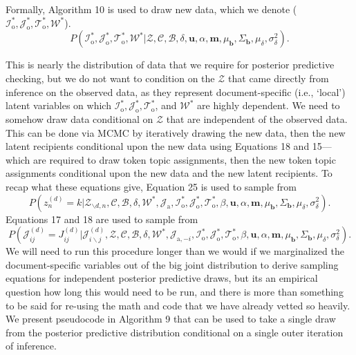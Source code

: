 \documentclass[a4paper]{article}
\begin{document}
Formally, Algorithm 10 is used to draw new data, which we denote ($\mathcal{I}_{\mbox{o}}^*, \mathcal{J}_{\mbox{o}}^*, \mathcal{T}_{\mbox{o}}^*,\mathcal{W}^*$).
\begin{equation}
P(\mathcal{I}_{\mbox{o}}^*, \mathcal{J}_{\mbox{o}}^*, \mathcal{T}_{\mbox{o}}^*,\mathcal{W}^* |\mathcal{Z}, \mathcal{C}, \mathcal{B}, \delta,\boldsymbol{u}, \alpha, \boldsymbol{m}, \mu_{\boldsymbol{b}}, \Sigma_{\boldsymbol{b}}, \mu_\delta, \sigma^2_\delta).
\label{eqn:backwardssample}
\end{equation}

This is nearly the distribution of data that we require for posterior predictive checking, but we do not want to condition on the $\mathcal{Z}$ that came directly from inference on the observed data, as they represent document-specific (i.e., `local') latent variables on which $\mathcal{I}_{\mbox{o}}^*, \mathcal{J}_{\mbox{o}}^*, \mathcal{T}_{\mbox{o}}^*$, and $\mathcal{W}^*$ are highly dependent. We need to somehow draw data conditional on $\mathcal{Z}$ that are independent of the observed data. This can be done via MCMC by iteratively drawing the  new data, then the new latent recipients conditional upon the new data using Equations 18 and 15---which are required to draw token topic assignments, then the new token topic assignments conditional upon the new data and the new latent recipients. To recap what these equations give, Equation 25 is used to sample from $$P(z^{(d)}_n=k|\mathcal{Z}_{\backslash d, n},   \mathcal{C},   \mathcal{B}, \delta, \mathcal{W}^*, \mathcal{J}_{\mbox{a}}, \mathcal{I}_{\mbox{o}}^*, \mathcal{J}_{\mbox{o}}^*, \mathcal{T}_{\mbox{o}}^*, \beta, \boldsymbol{u}, \alpha, \boldsymbol{m},  \mu_{\boldsymbol{b}}, \Sigma_{\boldsymbol{b}}, \mu_\delta, \sigma^2_\delta).$$ Equations 17 and 18 are used to sample from $$  P(\mathcal{J}^{(d)}_{ij} = {J}^{(d)}_{ij}|\mathcal{J}^{(d)}_{i\backslash j}, \mathcal{Z}, \mathcal{C},   \mathcal{B}, \delta, \mathcal{W}^*,  \mathcal{J}_{\mbox{a}, -i}, \mathcal{I}_{\mbox{o}}^*, \mathcal{J}_{\mbox{o}}^*, \mathcal{T}_{\mbox{o}}^*, \beta, \boldsymbol{u}, \alpha, \boldsymbol{m},  \mu_{\boldsymbol{b}}, \Sigma_{\boldsymbol{b}}, \mu_\delta, \sigma^2_\delta). $$ We will need to run this procedure longer than we would if we marginalized the document-specific variables out of the big joint distribution to derive sampling equations for independent posterior predictive draws, but its an empirical question how long this would need to be run, and there is more than something to be said for re-using the math and code that we have already vetted so heavily. We present pseudocode in Algorithm 9 that can be used to take a single draw from the posterior predictive distribution conditional on a single outer iteration of inference.
\end{document}
